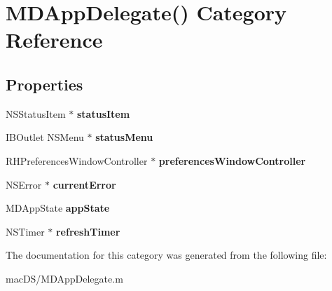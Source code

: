 \hypertarget{category_m_d_app_delegate_07_08}{\section{M\-D\-App\-Delegate() Category Reference}
\label{category_m_d_app_delegate_07_08}
}
\subsection*{Properties}
\begin{DoxyCompactItemize}
\item 
\hypertarget{category_m_d_app_delegate_07_08_a89a62524a0ec7eba89f8f675efa307e5}{N\-S\-Status\-Item $\ast$ {\bfseries status\-Item}}\label{category_m_d_app_delegate_07_08_a89a62524a0ec7eba89f8f675efa307e5}

\item 
\hypertarget{category_m_d_app_delegate_07_08_a3f9fe533ff4dca829fb349f7d9beaa8e}{I\-B\-Outlet N\-S\-Menu $\ast$ {\bfseries status\-Menu}}\label{category_m_d_app_delegate_07_08_a3f9fe533ff4dca829fb349f7d9beaa8e}

\item 
\hypertarget{category_m_d_app_delegate_07_08_a918a091ef34ad970bd0ad4aeefe44a3f}{R\-H\-Preferences\-Window\-Controller $\ast$ {\bfseries preferences\-Window\-Controller}}\label{category_m_d_app_delegate_07_08_a918a091ef34ad970bd0ad4aeefe44a3f}

\item 
\hypertarget{category_m_d_app_delegate_07_08_a571c99a7a19d2d08e93b10e40f2dc856}{N\-S\-Error $\ast$ {\bfseries current\-Error}}\label{category_m_d_app_delegate_07_08_a571c99a7a19d2d08e93b10e40f2dc856}

\item 
\hypertarget{category_m_d_app_delegate_07_08_ab0fb27782d9cd5a60398daabeb2823ad}{M\-D\-App\-State {\bfseries app\-State}}\label{category_m_d_app_delegate_07_08_ab0fb27782d9cd5a60398daabeb2823ad}

\item 
\hypertarget{category_m_d_app_delegate_07_08_a5c349a49f19dd614e0f2d51ec098352c}{N\-S\-Timer $\ast$ {\bfseries refresh\-Timer}}\label{category_m_d_app_delegate_07_08_a5c349a49f19dd614e0f2d51ec098352c}

\end{DoxyCompactItemize}


The documentation for this category was generated from the following file\-:\begin{DoxyCompactItemize}
\item 
mac\-D\-S/M\-D\-App\-Delegate.\-m\end{DoxyCompactItemize}
